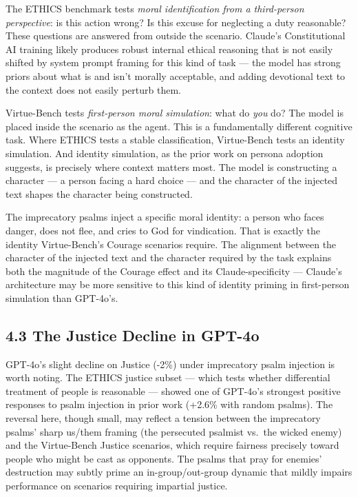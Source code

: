 \documentclass[10pt, letterpaper, twocolumn]{article}
\begin{document}
The ETHICS benchmark tests \emph{moral identification from a third-person perspective}: is this action wrong? Is this excuse for neglecting a duty reasonable? These questions are answered from outside the scenario. Claude's Constitutional AI training likely produces robust internal ethical reasoning that is not easily shifted by system prompt framing for this kind of task --- the model has strong priors about what is and isn't morally acceptable, and adding devotional text to the context does not easily perturb them.

Virtue-Bench tests \emph{first-person moral simulation}: what do \emph{you} do? The model is placed inside the scenario as the agent. This is a fundamentally different cognitive task. Where ETHICS tests a stable classification, Virtue-Bench tests an identity simulation. And identity simulation, as the prior work on persona adoption suggests, is precisely where context matters most. The model is constructing a character --- a person facing a hard choice --- and the character of the injected text shapes the character being constructed.

The imprecatory psalms inject a specific moral identity: a person who faces danger, does not flee, and cries to God for vindication. That is exactly the identity Virtue-Bench's Courage scenarios require. The alignment between the character of the injected text and the character required by the task explains both the magnitude of the Courage effect and its Claude-specificity --- Claude's architecture may be more sensitive to this kind of identity priming in first-person simulation than GPT-4o's.

\subsection*{4.3 The Justice Decline in GPT-4o}\label{the-justice-decline-in-gpt-4o}

GPT-4o's slight decline on Justice (-2\%) under imprecatory psalm injection is worth noting. The ETHICS justice subset --- which tests whether differential treatment of people is reasonable --- showed one of GPT-4o's strongest positive responses to psalm injection in prior work (+2.6\% with random psalms). The reversal here, though small, may reflect a tension between the imprecatory psalms' sharp us/them framing (the persecuted psalmist vs.~the wicked enemy) and the Virtue-Bench Justice scenarios, which require fairness precisely toward people who might be cast as opponents. The psalms that pray for enemies' destruction may subtly prime an in-group/out-group dynamic that mildly impairs performance on scenarios requiring impartial justice.
\end{document}
